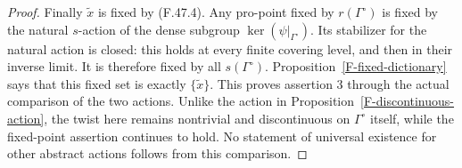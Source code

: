 \begin{proof}
Finally $\widetilde x$ is fixed by (F.47.4). Any pro-point
fixed by $r(\Gamma^\circ)$ is fixed by the natural
$s$-action of the dense subgroup
$\ker(\psi|_{\Gamma^\circ})$. Its stabilizer for the
natural action is closed: this holds at every finite
covering level, and then in their inverse limit.
It is therefore fixed by all $s(\Gamma^\circ)$.
Proposition~\ref{F-fixed-dictionary} says that this fixed
set is exactly $\{\widetilde x\}$. This proves assertion
3 through the actual comparison of the two actions.
Unlike the action in Proposition~\ref{F-discontinuous-action},
the twist here remains nontrivial and discontinuous on
$\Gamma^\circ$ itself, while the fixed-point assertion
continues to hold. No statement of universal existence
for other abstract actions follows from this comparison.
\end{proof}
